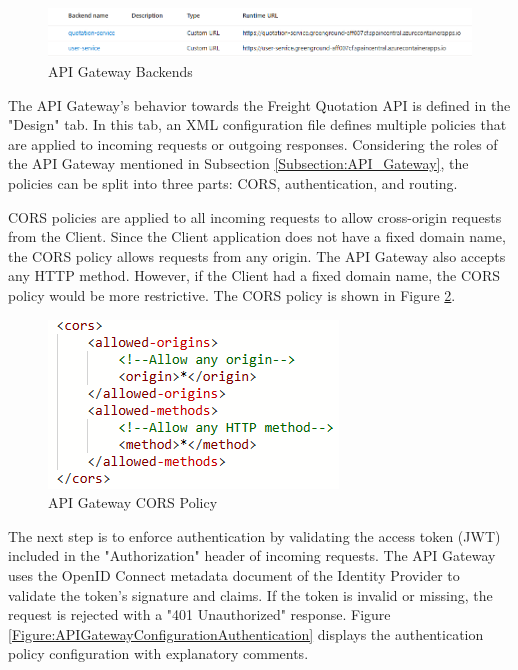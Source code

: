 \documentclass[12pt,reqno, oneside]{amsbook}
\theoremstyle{definition}
\theoremstyle{definition}
\numberwithin{section}{chapter}
\numberwithin{table}{chapter}
\numberwithin{figure}{chapter}
\begin{document}
\begin{figure}[H]
  \centering
  \includegraphics[width=0.9\linewidth]{images/APIGatewayBackends.png}
  \caption{\label{Figure:APIGatewayBackends}API Gateway Backends}
\end{figure}

The \ac{API} Gateway's behavior towards the Freight Quotation API is defined in the "Design" tab. In this tab, an \ac{XML} configuration file defines multiple policies that are applied to incoming requests or outgoing responses. Considering the roles of the \ac{API} Gateway mentioned in Subsection \ref{Subsection:API_Gateway}, the policies can be split into three parts: \Ac{CORS}, authentication, and routing.

\ac{CORS} policies are applied to all incoming requests to allow cross-origin requests from the Client. Since the Client application does not have a fixed domain name, the \ac{CORS} policy allows requests from any origin. The \ac{API} Gateway also accepts any \ac{HTTP} method. However, if the Client had a fixed domain name, the \ac{CORS} policy would be more restrictive. The \ac{CORS} policy is shown in Figure \ref{Figure:APIGatewayConfigurationCORS}.

\begin{figure}[H]
  \centering
  \includegraphics[width=0.4\linewidth]{images/APIGatewayConfigurationCORS.png}
  \caption{\label{Figure:APIGatewayConfigurationCORS}API Gateway \ac{CORS} Policy}
\end{figure}

The next step is to enforce authentication by validating the access token (\ac{JWT}) included in the "Authorization" header of incoming requests. The \ac{API} Gateway uses the OpenID Connect metadata document of the Identity Provider to validate the token's signature and claims. If the token is invalid or missing, the request is rejected with a "401 Unauthorized" response. Figure \ref{Figure:APIGatewayConfigurationAuthentication} displays the authentication policy configuration with explanatory comments.
\end{document}
